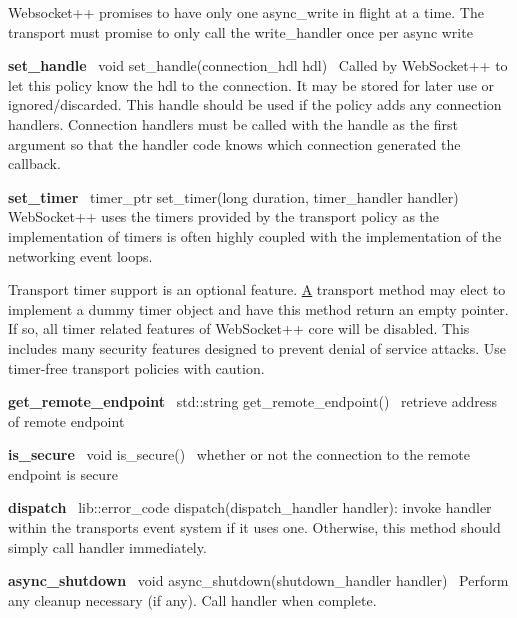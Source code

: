 Websocket++ promises to have only one async\+\_\+write in flight at a time. The transport must promise to only call the write\+\_\+handler once per async write

{\bfseries set\+\_\+handle}~\newline
{\ttfamily void set\+\_\+handle(connection\+\_\+hdl hdl)}~\newline
Called by Web\+Socket++ to let this policy know the hdl to the connection. It may be stored for later use or ignored/discarded. This handle should be used if the policy adds any connection handlers. Connection handlers must be called with the handle as the first argument so that the handler code knows which connection generated the callback.

{\bfseries set\+\_\+timer}~\newline
{\ttfamily timer\+\_\+ptr set\+\_\+timer(long duration, timer\+\_\+handler handler)}~\newline
Web\+Socket++ uses the timers provided by the transport policy as the implementation of timers is often highly coupled with the implementation of the networking event loops.

Transport timer support is an optional feature. \mbox{\hyperlink{struct_a}{A}} transport method may elect to implement a dummy timer object and have this method return an empty pointer. If so, all timer related features of Web\+Socket++ core will be disabled. This includes many security features designed to prevent denial of service attacks. Use timer-\/free transport policies with caution.

{\bfseries get\+\_\+remote\+\_\+endpoint}~\newline
{\ttfamily std\+::string get\+\_\+remote\+\_\+endpoint()}~\newline
retrieve address of remote endpoint

{\bfseries is\+\_\+secure}~\newline
{\ttfamily void is\+\_\+secure()}~\newline
whether or not the connection to the remote endpoint is secure

{\bfseries dispatch}~\newline
{\ttfamily lib\+::error\+\_\+code dispatch(dispatch\+\_\+handler handler)}\+: invoke handler within the transport\textquotesingle{}s event system if it uses one. Otherwise, this method should simply call {\ttfamily handler} immediately.

{\bfseries async\+\_\+shutdown}~\newline
{\ttfamily void async\+\_\+shutdown(shutdown\+\_\+handler handler)}~\newline
Perform any cleanup necessary (if any). Call {\ttfamily handler} when complete.

